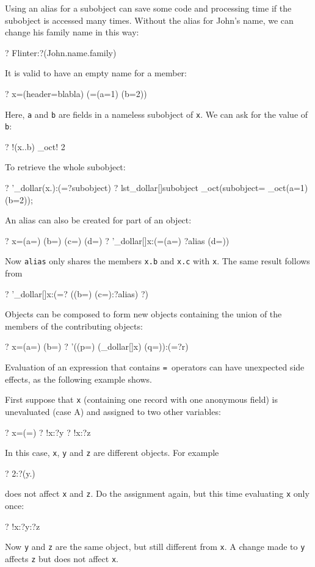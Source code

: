 \documentclass[12pt]{article}
\begin{document}
Using an alias for a subobject can save some code and processing time
if the subobject is accessed many times. Without the alias for John's
name, we can change his family name in this way:
\begin{ex}
{?} Flinter:?(John.name.family)
\end{ex}

It is valid to have an empty name for a member:
\begin{ex}
{?} x=(header=blabla) (=(a=1) (b=2))
\end{ex}

Here, \verb|a| and \verb|b| are fields in a nameless subobject of
\verb|x|. We can ask for the value of \verb|b|:
\begin{ex}
{?} !(x..b)
_oct{!} 2
\end{ex}

To retrieve the whole subobject:
\begin{ex}
{?} '_dollar(x.):(=?subobject)
{?} lst_dollar[]subobject
_oct(subobject=
_oct(a=1) (b=2));
\end{ex}

An alias can also be created for part of an object:
\begin{ex}
{?} x=(a=) (b=) (c=) (d=)
{?} '_dollar[]x:(=(a=) ?alias (d=))
\end{ex}

Now \verb|alias| only shares the members \verb|x.b| and \verb|x.c|
with \verb|x|. The same result follows from
\begin{ex}
{?} '_dollar[]x:(=? ((b=) (c=):?alias) ?)
\end{ex}

Objects can be composed to form new objects containing the union of
the members of the contributing objects:
\begin{ex}
{?} x=(a=) (b=)
{?} '((p=) (_dollar[]x) (q=)):(=?r)
\end{ex}

Evaluation of an expression that contains \verb|= |operators can have
unexpected side effects, as the following example shows.

First suppose that \verb|x| (containing one record with one anonymous
field) is unevaluated (case A) and assigned to two other variables:
\begin{ex}
{?} x=(=)
{?} !x:?y
{?} !x:?z
\end{ex}

In this case, \verb|x|, \verb|y| and \verb|z| are different
objects. For example
\begin{ex}
{?} 2:?(y.)
\end{ex}
does not affect \verb|x| and \verb|z|. Do the assignment again, but this
time evaluating \verb|x| only once:
\begin{ex}
{?} !x:?y:?z
\end{ex}
Now \verb|y| and \verb|z| are the same object, but still different
from \verb|x|. A change made to \verb|y| affects \verb|z| but does not
affect \verb|x|.
\end{document}
